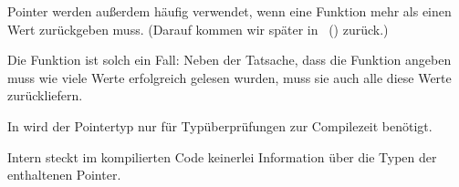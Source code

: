 Pointer werden außerdem häufig verwendet, wenn eine Funktion mehr als einen Wert zurückgeben muss. (Darauf kommen wir später in ~() zurück.)

Die Funktion  ist solch ein Fall: Neben der Tatsache, dass die Funktion angeben muss wie viele Werte erfolgreich gelesen wurden, muss sie auch alle diese Werte zurückliefern.

In \CCpp wird der Pointertyp nur für Typüberprüfungen zur Compilezeit benötigt.

Intern steckt im kompilierten Code keinerlei Information über die Typen der enthaltenen Pointer.






